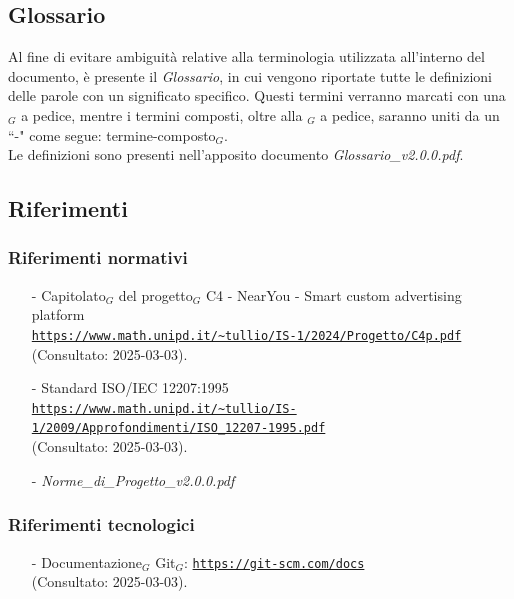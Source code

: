 \documentclass[10pt]{article}
\begin{document}
\begin{justify}
\subsection{Glossario}
Al fine di evitare ambiguità relative alla terminologia utilizzata all'interno del documento, è presente il \textit{Glossario}, in cui vengono riportate tutte le definizioni delle parole con un significato specifico. Questi termini verranno marcati con una $_G$ a pedice, mentre i termini composti, oltre alla $_G$ a pedice, saranno uniti da un ``-" come segue: termine-composto$_G$.\\
Le definizioni sono presenti nell'apposito documento \textit{Glossario\_v2.0.0.pdf}.

\subsection{Riferimenti}

\subsubsection{Riferimenti normativi}
\begin{itemize}
    \item[-] Capitolato$_G$ del progetto$_G$ C4 - NearYou - Smart custom advertising platform \\ 
    \textcolor{blue}{\texttt{\url{https://www.math.unipd.it/~tullio/IS-1/2024/Progetto/C4p.pdf}}} \\ 
    (Consultato: 2025-03-03).
    
    \item[-] Standard ISO/IEC 12207:1995 \\ 
    \textcolor{blue}{\texttt{\url{https://www.math.unipd.it/~tullio/IS-1/2009/Approfondimenti/ISO_12207-1995.pdf}}} \\
    (Consultato: 2025-03-03).
    
    \item[-] \textit{Norme\_di\_Progetto\_v2.0.0.pdf}
\end{itemize}

\subsubsection{Riferimenti tecnologici}
\begin{itemize}
    \item[-] Documentazione$_G$ Git$_G$: \textcolor{blue}{\texttt{\url{https://git-scm.com/docs}}} \\
    (Consultato: 2025-03-03).
    

\end{itemize}
\end{justify}
\end{document}
